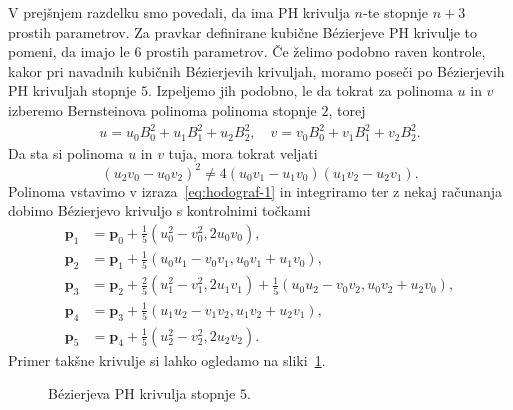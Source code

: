 \documentclass[isrm2, tisk]{fmfdelo}
\newcommand{\p}{\mathbf{p}}
\begin{document}
    V prejšnjem razdelku smo povedali, da ima PH krivulja $n$-te stopnje $n+3$ prostih parametrov.
    Za pravkar definirane kubične Bézierjeve PH krivulje to pomeni, da imajo le $6$ prostih parametrov.
    Če želimo podobno raven kontrole, kakor pri navadnih kubičnih Bézierjevih krivuljah, moramo poseči po Bézierjevih PH krivuljah stopnje $5$.
    Izpeljemo jih podobno, le da tokrat za polinoma $u$ in $v$  izberemo Bernsteinova polinoma polinoma stopnje $2$, torej
    \begin{align}
        \label{eq:ph-bernstein-2}
        u=u_0B_{0}^{2}+u_1B_{1}^{2}+u_2B_{2}^{2}, \quad v=v_0B_{0}^{2}+v_1B_{1}^{2}+v_2B_{2}^{2}.
    \end{align}
    Da sta si polinoma $u$ in $v$ tuja, mora tokrat veljati \[(u_2 v_0 -u_0 v_2)^2 \neq 4(u_0 v_1 - u_1 v_0)(u_1 v_2-u_2v_1).\]
    Polinoma vstavimo v izraza~\eqref{eq:hodograf-1} in integriramo ter z nekaj računanja dobimo Bézierjevo krivuljo s kontrolnimi točkami
    \begin{align}
        \p_1 &=\p_0+\frac{1}{5}(u_0^2-v_0^2,2u_0v_0),  \nonumber\\
        \p_2 &= \p_1+\frac{1}{5}(u_0u_1-v_0v_1, u_0v_1+u_1v_0), \nonumber\\
        \p_3 &= \p_2 + \frac{2}{5}(u_1^2-v_1^2, 2u_1v_1) + \frac{1}{5}(u_0u_2-v_0v_2, u_0v_2+u_2v_0), \label{eq:ph-kontrolne-5}\\
        \p_4 &= \p_3+\frac{1}{5}(u_1u_2-v_1v_2, u_1v_2+u_2v_1), \nonumber\\
        \p_5 &=\p_4+\frac{1}{5}(u_2^2-v_2^2,2u_2v_2). \nonumber
    \end{align}
    Primer takšne krivulje si lahko ogledamo na sliki~\ref{fig:kvinticna-ph}.
    \begin{figure}[h]
        \centering
        \caption{Bézierjeva PH krivulja stopnje $5$.}\label{fig:kvinticna-ph}
    \end{figure}
\end{document}
